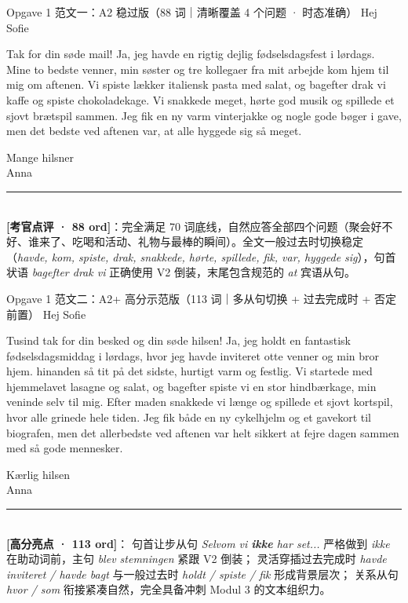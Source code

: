 \begin{emailbox}{Opgave 1 范文一：A2 稳过版（88 词｜清晰覆盖 4 个问题 · 时态准确）}
Hej Sofie

Tak for din søde mail! Ja, jeg havde en rigtig dejlig fødselsdagsfest i lørdags. Mine to bedste venner, min søster og tre kollegaer fra mit arbejde kom hjem til mig om aftenen. Vi spiste lækker italiensk pasta med salat, og bagefter drak vi kaffe og spiste chokoladekage. Vi snakkede meget, hørte god musik og spillede et sjovt brætspil sammen. Jeg fik en ny varm vinterjakke og nogle gode bøger i gave, men det bedste ved aftenen var, at alle hyggede sig så meget.

Mange hilsner\\
Anna

\vspace{0.3em}
\rule{\linewidth}{0.4pt}\\[0.2em]
\small\textbf{\color{NCDTeal}[考官点评 · 88 ord]}：完全满足 70 词底线，自然应答全部四个问题（聚会好不好、谁来了、吃喝和活动、礼物与最棒的瞬间）。全文一般过去时切换稳定（\textit{havde, kom, spiste, drak, snakkede, hørte, spillede, fik, var, hyggede sig}），句首状语 \textit{bagefter drak vi} 正确使用 V2 倒装，末尾包含规范的 \textit{at} 宾语从句。
\end{emailbox}

\begin{emailbox}{Opgave 1 范文二：A2+ 高分示范版（113 词｜多从句切换 + 过去完成时 + 否定前置）}
Hej Sofie

Tusind tak for din besked og din søde hilsen! Ja, jeg holdt en fantastisk fødselsdagsmiddag i lørdags, hvor jeg havde inviteret otte venner og min bror hjem.  hinanden så tit på det sidste,  hurtigt varm og festlig. Vi startede med hjemmelavet lasagne og salat, og bagefter spiste vi en stor hindbærkage,  min veninde selv  til mig. Efter maden snakkede vi længe og spillede et sjovt kortspil, hvor alle grinede hele tiden. Jeg fik både en ny cykelhjelm og et gavekort til biografen, men det allerbedste ved aftenen var helt sikkert at fejre dagen sammen med så gode mennesker.

Kærlig hilsen\\
Anna

\vspace{0.3em}
\rule{\linewidth}{0.4pt}\\[0.2em]
\small\textbf{\color{NCDNavy}[高分亮点 · 113 ord]}： 句首让步从句 \textit{Selvom vi \textbf{ikke} har set...} 严格做到 \textit{ikke} 在助动词前，主句 \textit{blev stemningen} 紧跟 V2 倒装； 灵活穿插过去完成时 \textit{havde inviteret / havde bagt} 与一般过去时 \textit{holdt / spiste / fik} 形成背景层次； 关系从句 \textit{hvor / som} 衔接紧凑自然，完全具备冲刺 Modul 3 的文本组织力。
\end{emailbox}

